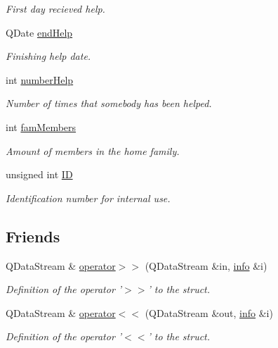 \begin{DoxyCompactItemize}
\begin{DoxyCompactList}\small\item\em First day recieved help. \end{DoxyCompactList}\item 
Q\+Date \hyperlink{classinfo_ac9af3f49f3357521492ffaf635897af4}{end\+Help}
\begin{DoxyCompactList}\small\item\em Finishing help date. \end{DoxyCompactList}\item 
int \hyperlink{classinfo_a96e373e7fbb00b84889fba5f87e23c6a}{number\+Help}
\begin{DoxyCompactList}\small\item\em Number of times that somebody has been helped. \end{DoxyCompactList}\item 
int \hyperlink{classinfo_a1b51e61437e4e0b422a49ad00b8a4e65}{fam\+Members}
\begin{DoxyCompactList}\small\item\em Amount of members in the home family. \end{DoxyCompactList}\item 
unsigned int \hyperlink{classinfo_a3c042f827b9847005666b1ecc5221549}{I\+D}
\begin{DoxyCompactList}\small\item\em Identification number for internal use. \end{DoxyCompactList}\end{DoxyCompactItemize}
\subsection*{Friends}
\begin{DoxyCompactItemize}
\item 
Q\+Data\+Stream \& \hyperlink{classinfo_aa1cff6f546458f788536a635780f7014}{operator$>$$>$} (Q\+Data\+Stream \&in, \hyperlink{classinfo}{info} \&i)
\begin{DoxyCompactList}\small\item\em Definition of the operator '$>$$>$' to the struct. \end{DoxyCompactList}\item 
Q\+Data\+Stream \& \hyperlink{classinfo_abc99bd8cbdd8d6f6ee6a15abc543fd26}{operator$<$$<$} (Q\+Data\+Stream \&out, \hyperlink{classinfo}{info} \&i)
\begin{DoxyCompactList}\small\item\em Definition of the operator '$<$$<$' to the struct. \end{DoxyCompactList}\end{DoxyCompactItemize}


